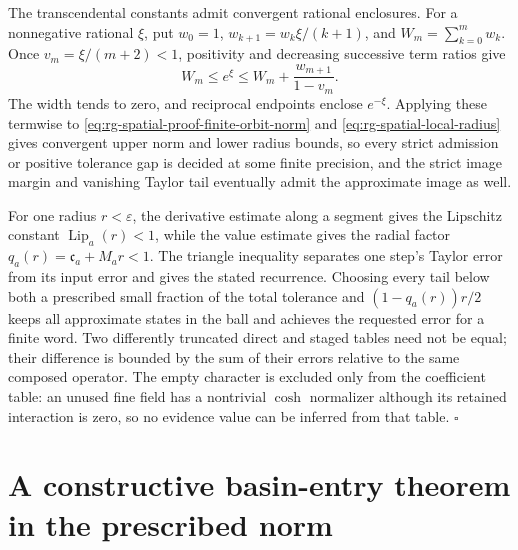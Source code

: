 The transcendental constants admit convergent rational enclosures. For a
nonnegative rational \(\xi\), put \(w_0=1\), \(w_{k+1}=w_k\xi/(k+1)\), and
\(W_m=\sum_{k=0}^mw_k\). Once \(v_m=\xi/(m+2)<1\), positivity and
decreasing successive term ratios give
\begin{equation}
 W_m\le e^\xi\le W_m+\frac{w_{m+1}}{1-v_m}.
 \label{eq:rg-spatial-proof-exp-enclosure}
\end{equation}
The width tends to zero, and reciprocal endpoints enclose \(e^{-\xi}\).
Applying these termwise to \cref{eq:rg-spatial-proof-finite-orbit-norm} and
\cref{eq:rg-spatial-local-radius} gives convergent upper norm and lower
radius bounds, so every strict admission or positive tolerance gap is
decided at some finite precision, and the strict image margin and vanishing
Taylor tail eventually admit the approximate image as well.

For one radius \(r<\varepsilon\), the derivative estimate along a segment
gives the Lipschitz constant \(\operatorname{Lip}_a(r)<1\), while the value
estimate gives the radial factor \(q_a(r)=\mathfrak c_a+M_ar<1\). The
triangle inequality separates one step's Taylor error from its input error
and gives the stated recurrence. Choosing every tail below both a
prescribed small fraction of the total tolerance and \((1-q_a(r))r/2\) keeps
all approximate states in the ball and achieves the requested error for a
finite word. Two differently truncated direct and staged tables need not be
equal; their difference is bounded by the sum of their errors relative to
the same composed operator. The empty character is excluded only from the
coefficient table: an unused fine field has a nontrivial \(\cosh\)
normalizer although its retained interaction is zero, so no evidence value
can be inferred from that table. \hfill\(\square\)

\section{A constructive basin-entry theorem in the prescribed norm}
\label{sec:rg-spatial-proof-basin}

